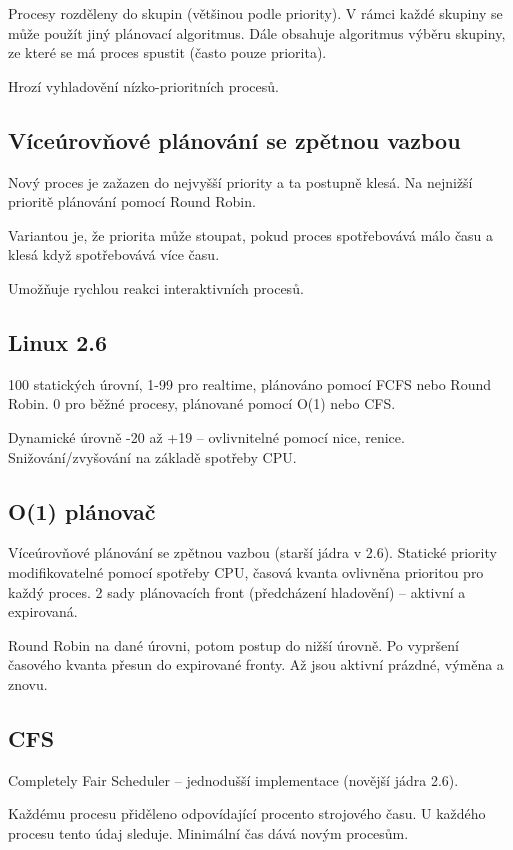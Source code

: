 \documentclass[a4paper, 11pt]{report}
\begin{document}
Procesy rozděleny do skupin (většinou podle priority). V rámci každé skupiny se může použít jiný plánovací algoritmus. Dále obsahuje algoritmus výběru skupiny, ze které se má proces spustit (často pouze priorita).

Hrozí vyhladovění nízko-prioritních procesů.

\subsection{Víceúrovňové plánování se zpětnou vazbou}

Nový proces je zažazen do nejvyšší priority a ta postupně klesá. Na nejnižší prioritě plánování pomocí Round Robin.

Variantou je, že priorita může stoupat, pokud proces spotřebovává málo času a klesá když spotřebovává více času.

Umožňuje rychlou reakci interaktivních procesů.

\subsection{Linux 2.6}

100 statických úrovní, 1-99 pro realtime, plánováno pomocí FCFS nebo Round Robin. 0 pro běžné procesy, plánované pomocí O(1) nebo CFS.

Dynamické úrovně -20 až +19 -- ovlivnitelné pomocí nice, renice. Snižování/zvyšování na základě spotřeby CPU.

\subsection{O(1) plánovač}
Víceúrovňové plánování se zpětnou vazbou (starší jádra v 2.6). Statické priority modifikovatelné pomocí spotřeby CPU, časová kvanta ovlivněna prioritou pro každý proces. 2 sady plánovacích front (předcházení hladovění) -- aktivní a expirovaná.

Round Robin na dané úrovni, potom postup do nižší úrovně. Po vypršení časového kvanta přesun do expirované fronty. Až jsou aktivní prázdné, výměna a znovu.

\subsection{CFS}

Completely Fair Scheduler -- jednodušší implementace (novější jádra 2.6).

Každému procesu přiděleno odpovídající procento strojového času. U každého procesu tento údaj sleduje. Minimální čas dává novým procesům.
\end{document}
